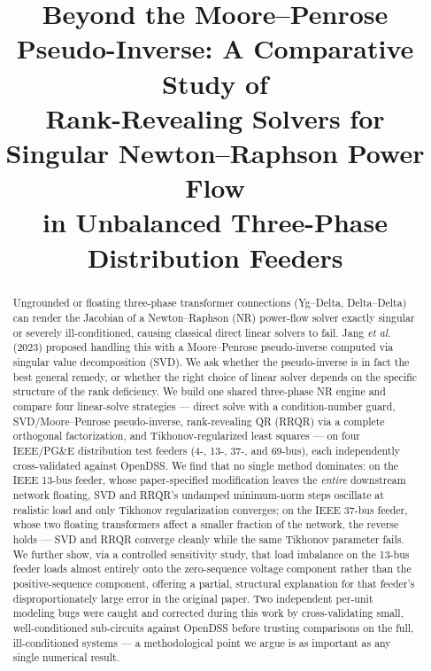 \documentclass[conference]{IEEEtran}
\begin{document}
\title{Beyond the Moore--Penrose Pseudo-Inverse: A Comparative Study of\\
Rank-Revealing Solvers for Singular Newton--Raphson Power Flow\\
in Unbalanced Three-Phase Distribution Feeders}

\author{
}

\maketitle

\begin{abstract}
Ungrounded or floating three-phase transformer connections (Yg--Delta,
Delta--Delta) can render the Jacobian of a Newton--Raphson (NR) power-flow
solver exactly singular or severely ill-conditioned, causing classical
direct linear solvers to fail. Jang \emph{et al.} (2023) proposed handling
this with a Moore--Penrose pseudo-inverse computed via singular value
decomposition (SVD). We ask whether the pseudo-inverse is in fact the best
general remedy, or whether the right choice of linear solver depends on the
specific structure of the rank deficiency. We build one shared three-phase
NR engine and compare four linear-solve strategies --- direct solve with a
condition-number guard, SVD/Moore--Penrose pseudo-inverse, rank-revealing
QR (RRQR) via a complete orthogonal factorization, and Tikhonov-regularized
least squares --- on four IEEE/PG\&E distribution test feeders (4-, 13-,
37-, and 69-bus), each independently cross-validated against OpenDSS. We
find that no single method dominates: on the IEEE 13-bus feeder, whose
paper-specified modification leaves the \emph{entire} downstream network
floating, SVD and RRQR's undamped minimum-norm steps oscillate at realistic
load and only Tikhonov regularization converges; on the IEEE 37-bus feeder,
whose two floating transformers affect a smaller fraction of the network,
the reverse holds --- SVD and RRQR converge cleanly while the same
Tikhonov parameter fails. We further show, via a controlled sensitivity
study, that load imbalance on the 13-bus feeder loads almost entirely onto
the zero-sequence voltage component rather than the positive-sequence
component, offering a partial, structural explanation for that feeder's
disproportionately large error in the original paper. Two independent
per-unit modeling bugs were caught and corrected during this work by
cross-validating small, well-conditioned sub-circuits against OpenDSS
before trusting comparisons on the full, ill-conditioned systems --- a
methodological point we argue is as important as any single numerical
result.
\end{abstract}
\end{document}
